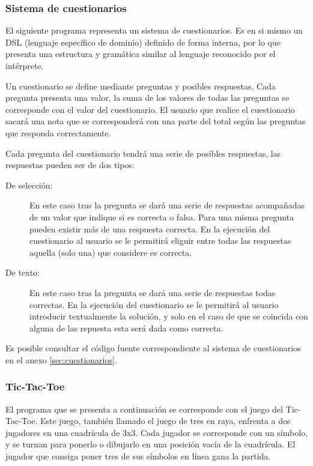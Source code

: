 \subsubsection{Sistema de cuestionarios}
El siguiente programa representa un sistema de cuestionarios. Es en si mismo un DSL (lenguaje específico de dominio) definido de forma 
interna, por lo que presenta una estructura y gramática similar al lenguaje reconocido por el intérprete. 

Un cuestionario se define mediante preguntas y posibles respuestas. Cada pregunta presenta una valor, la suma de los valores de todas las preguntas 
se corresponde con el valor del cuestionario. El usuario que realice el cuestionario sacará una nota que se corresponderá con una parte del total según las preguntas
que responda correctamente. 

Cada pregunta del cuestionario tendrá una serie de posibles respuestas, las respuestas pueden ser de dos tipos:

\begin{description}
\item [De selección:] En este caso tras la pregunta se dará una serie de respuestas acompañadas de un valor que indique si es correcta o falsa. Para una misma pregunta pueden
existir más de una respuesta correcta. En la ejecución del cuestionario al usuario se le permitirá eliguir entre todas las respuestas aquella (solo una) que considere es correcta.
\item [De texto:] En este caso tras la pregunta se dará una serie de respuestas todas correctas. En la ejecución del cuestionario se le permitirá al usuario introducir textualmente
la solución, y solo en el caso de que se coincida con alguna de las repuesta esta será dada como correcta.
\end{description}

Es posible consultar el código fuente correspondiente al sistema de cuestionarios en el anexo \ref{sec:cuestionarios}.

\subsubsection {Tic-Tac-Toe}
El programa que se presenta a continuación se corresponde con el juego del Tic-Tac-Toe. Este juego, también llamado 
el juego de tres en raya, enfrenta a dos jugadores en una cuadrícula de 3x3. Cada jugador se corresponde con un símbolo, y
se turnan para ponerlo o dibujarlo en una posición vacía de la cuadrícula. El jugador que consiga poner tres de sus símbolos en línea
gana la partida. 

